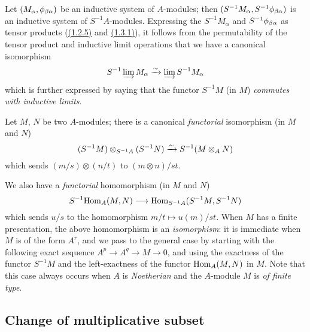 \begin{env}[1.3.3]
\label{0.1.3.3}
Let $(M_\alpha,\phi_{\beta\alpha})$ be an inductive system of $A$-modules; then
$(S^{-1}M_\alpha,S^{-1}\phi_{\beta\alpha})$ is an inductive system of
$S^{-1}A$-modules. Expressing the $S^{-1}M_\alpha$ and
$S^{-1}\phi_{\beta\alpha}$ as tensor products (\hyperref[0.1.2.5]{(1.2.5)} and
\hyperref[0.1.3.1]{(1.3.1)}), it follows from the permutability of the tensor product and
inductive limit operations that we have a canonical isomorphism
\[
  S^{-1}\varinjlim M_\alpha\xrightarrow{\sim}\varinjlim S^{-1}M_\alpha
\]
which is further expressed by saying that the functor $S^{-1}M$ (in $M$)
{\em commutes with inductive limits}.
\end{env}

\begin{env}[1.3.4]
\label{0.1.3.4}
Let $M$, $N$ be two $A$-modules; there is a canonical {\em functorial}
isomorphism (in $M$ and $N$)
\[
  (S^{-1}M)\otimes_{S^{-1}A}(S^{-1}N)\xrightarrow{\sim} S^{-1}(M\otimes_A N)
\]
which sends $(m/s)\otimes(n/t)$ to $(m\otimes n)/st$.
\end{env}

\begin{env}[1.3.5]
\label{0.1.3.5}
We also have a {\em functorial} homomorphism (in $M$ and $N$)
\[
  S^{-1}{\mathop{\mathrm{Hom}}\nolimits}_A(M,N)\longrightarrow{\mathop{\mathrm{Hom}}\nolimits}_{S^{-1}A}(S^{-1}M,S^{-1}N)
\]
which sends $u/s$ to the homomorphism $m/t\mapsto u(m)/st$. When $M$ has a
finite presentation, the above homomorphism is an {\em isomorphism}: it is
immediate when $M$ is of the form $A^r$, and we pass to the general case by
starting with the following exact sequence $A^p\to A^q\to M\to 0$, and using the
exactness of the functor $S^{-1}M$ and the left-exactness of the functor
${\mathop{\mathrm{Hom}}\nolimits}_A(M,N)$ in $M$. Note that this case always occurs when $A$ is
{\em Noetherian} and the $A$-module $M$ is {\em of finite type}.
\end{env}

\subsection{Change of multiplicative subset}
\label{subsection-change-of-mult-subset}

